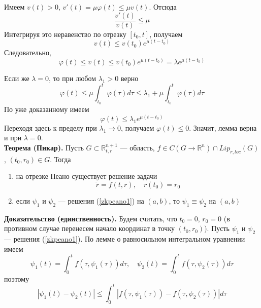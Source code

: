 \documentclass{article}
\begin{document}
Имеем $v(t) > 0$, $v'(t) = \mu\varphi(t) \le \mu v(t)$. Отсюда
\begin{equation*}
    \frac{v'(t)}{v(t)} \le \mu
\end{equation*}
Интегрируя это неравенство по отрезку $[t_0, t]$, получаем
\begin{equation*}
    v(t) \le v(t_0)e^{\mu(t-t_0)}
\end{equation*}
Следовательно,
\begin{equation*}
    \varphi(t) \le v(t) \le v(t_0)e^{\mu(t-t_0)} = \lambda e^{\mu(t-t_0)}
\end{equation*}

Если же $\lambda = 0$, то при любом $\lambda_1 > 0$ верно
\begin{equation*}
    \varphi(t) \le \mu \int_{t_0}^t \varphi(\tau)d\tau \le \lambda_1 + \mu \int_{t_0}^t \varphi(\tau)d\tau
\end{equation*}
По уже доказанному имеем
\begin{equation*}
    \varphi(t) \le \lambda_1 e^{\mu (t - t_0)}
\end{equation*}
Переходя здесь к пределу при $\lambda_1 \to 0$, получаем $\varphi(t) \le 0$. Значит, лемма верна и при $\lambda = 0$.\\

\noindent \textbf{Теорема (Пикар).} Пусть $G \subset \mathbb{R}_{t,r}^{n+1}$ --- область, $f \in C(G \to \mathbb{R}^n) \cap Lip_{r,loc}(G)$, $(t_0, r_0) \in G$. Тогда
\begin{enumerate}
    \item на отрезке Пеано существует решение задачи
    \begin{equation}
        \dot{r} = f(t,r), \quad r(t_0) = r_0 \label{zkpeano1}
    \end{equation}
    \item если $\psi_1$ и $\psi_2$ --- решения (\ref{zkpeano1}) на $(a,b)$, то $\psi_1 \equiv \psi_2$ на $(a,b)$
\end{enumerate}
\textbf{Доказательство (единственность).} Будем считать, что $t_0 = 0$, $r_0 = 0$ (в противном случае перенесем начало координат в точку $(t_0, r_0)$). Пусть $\psi_1$ и $\psi_2$ --- решения (\ref{zkpeano1}). По лемме о равносильном интегральном уравнении имеем
\begin{equation*}
    \psi_1(t) = \int_0^t f(\tau, \psi_1(\tau))d\tau, \quad \psi_2(t) = \int_0^t f(\tau, \psi_2(\tau))d\tau
\end{equation*}
поэтому
\begin{equation*}
    |\psi_1(t) - \psi_2(t)| \le \int_0^t |f(\tau, \psi_1(\tau)) - f(\tau, \psi_2(\tau))|d\tau
\end{equation*}
\end{document}
